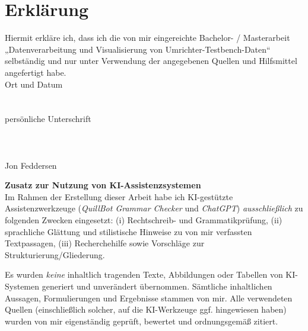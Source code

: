 \newpage
\section{Erklärung}
\label{sec:erklarung}
\label{sec:erklärung}

Hiermit erkläre ich, dass ich die von mir eingereichte Bachelor- / Masterarbeit
„Datenverarbeitung und Visualisierung von Umrichter-Testbench-Daten“ selbständig und nur unter Verwendung der
angegebenen Quellen und Hilfsmittel angefertigt habe.
\\
Ort und Datum
\\
\\
\\
persönliche Unterschrift
\\
\\
\\
\\
Jon Feddersen


\medskip
\noindent\textbf{Zusatz zur Nutzung von KI-Assistenzsystemen}\\
Im Rahmen der Erstellung dieser Arbeit habe ich KI-gestützte Assistenzwerkzeuge
(\emph{QuillBot Grammar Checker} und \emph{ChatGPT})
\emph{ausschließlich} zu folgenden Zwecken eingesetzt:
(i) Rechtschreib- und Grammatikprüfung,
(ii) sprachliche Glättung und stilistische Hinweise zu von mir verfassten Textpassagen,
(iii) Recherchehilfe sowie Vorschläge zur Strukturierung/Gliederung.

Es wurden \emph{keine} inhaltlich tragenden Texte, Abbildungen oder Tabellen von KI-Systemen generiert und unverändert übernommen. Sämtliche inhaltlichen Aussagen, Formulierungen und Ergebnisse stammen von mir.
Alle verwendeten Quellen (einschließlich solcher, auf die KI-Werkzeuge ggf. hingewiesen haben) wurden von mir eigenständig geprüft, bewertet und ordnungsgemäß zitiert.
